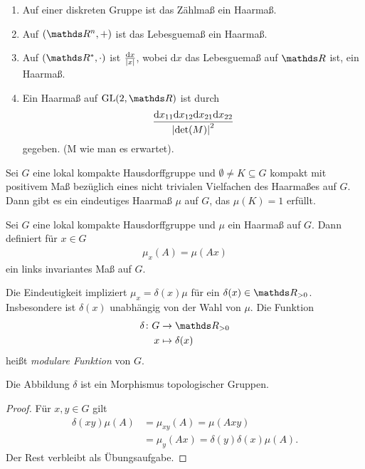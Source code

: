 \begin{bsp}
\begin{enumerate}[label=\roman*)]
\item Auf einer diskreten Gruppe ist das Zählmaß ein Haarmaß.
\item Auf $(\Rn,+)$ ist das Lebesguemaß ein Haarmaß.
\item Auf $(\R^\ast,\cdot)$ ist $\frac{\mathrm{d}x}{\left\vert x\right\vert}$, wobei $\mathrm{d}x$ das Lebesguemaß auf $\R$ ist, ein Haarmaß.
\item Ein Haarmaß auf $\GL(2,\R)$ ist durch
\begin{align*}
\frac{\mathrm{d}x_{11}\mathrm{d}x_{12}\mathrm{d}x_{21}\mathrm{d}x_{22}}{\left\vert\det(M)\right\vert^2}
\end{align*}
gegeben. (M wie man es erwartet).
\end{enumerate}
\end{bsp}

\begin{thm}
Sei $G$ eine lokal kompakte Hausdorffgruppe und $\emptyset \not =K\subseteq G$ kompakt mit positivem Maß bezüglich eines nicht trivialen Vielfachen des Haarmaßes auf $G$. Dann gibt es ein eindeutiges Haarmaß $\mu$ auf $G$, das $\mu(K)=1$ erfüllt.
\end{thm}


\begin{defi}
Sei $G$ eine lokal kompakte Hausdorffgruppe und $\mu$ ein Haarmaß auf $G$.
Dann definiert für $x\in G$
\begin{align*}
\mu_x(A)=\mu(Ax)
\end{align*}
ein links invariantes Maß auf $G$.
\end{defi}

\begin{defi}
Die Eindeutigkeit impliziert $\mu_x=\delta(x) \mu$ für ein $\delta(x)\in \R_{> 0}$.
Insbesondere ist $\delta(x)$ unabhängig von der Wahl von $\mu$.
Die Funktion
\begin{align*}
\delta \colon G &\to \R_{> 0}\\
x &\mapsto \delta(x)
\end{align*}
heißt \emph{modulare Funktion} von $G$.
\end{defi}

\begin{prop}
Die Abbildung $\delta$ ist ein Morphismus topologischer Gruppen.
\end{prop}
\begin{proof}
Für $x,y\in G$ gilt
\begin{align*}
\delta(xy)\mu(A)&=\mu_{xy}(A)=\mu(Axy)\\
&=\mu_y(Ax)=\delta(y)\delta(x)\mu(A).
\end{align*}
Der Rest verbleibt als Übungsaufgabe.
\end{proof}

